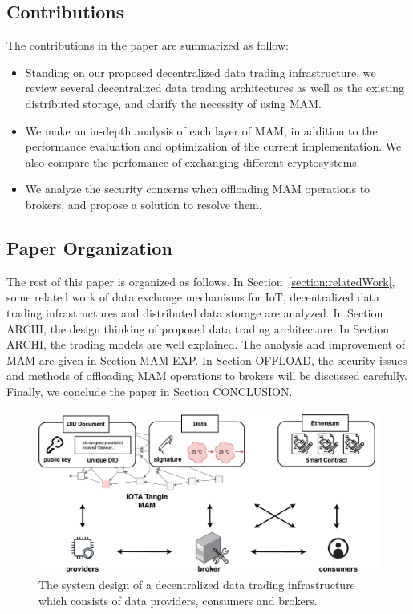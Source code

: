 \documentclass[conference]{IEEEtran}
\begin{document}
\subsection{Contributions}
The contributions in the paper are summarized as follow:
\begin{itemize}
	\item Standing on our proposed decentralized data trading infrastructure, we review several decentralized data trading architectures as well as the existing distributed storage, and clarify the necessity of using MAM.  
    \item We make an in-depth analysis of each layer of MAM, in addition to the performance evaluation and optimization of the current implementation. We also compare the perfomance of exchanging different cryptosystems.
	\item We analyze the security concerns when offloading MAM operations to brokers, and propose a solution to resolve them.
\end{itemize}


\subsection{Paper Organization}
The rest of this paper is organized as follows. In Section~\ref{section:relatedWork}, some related work of data exchange mechanisms for IoT, decentralized data trading infrastructures and distributed data storage are analyzed. In Section ARCHI, the design thinking of proposed data trading architecture. In Section ARCHI, the trading models are well explained. The analysis and improvement of MAM are given in Section MAM-EXP. In Section OFFLOAD, the security issues and methods of offloading MAM operations to brokers will be discussed carefully. Finally, we conclude the paper in Section CONCLUSION.

\begin{figure}[!t]
    \centering
    \includegraphics[width=3.in]{system_design}
    \caption{The system design of a decentralized data trading infrastructure which consists of data providers, consumers and brokers.}
    \label{fig:system_design}
\end{figure}
\end{document}
